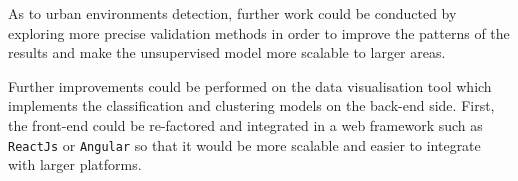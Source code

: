 \documentclass[bsc,frontabs,twoside,singlespacing, parskip,deptreport]{infthesis}     %
\begin{document}
As to urban environments detection, further work could be conducted by exploring more precise validation methods in order to improve the patterns of the results and make the unsupervised model more scalable to larger areas.

Further improvements could be performed on the data visualisation tool which implements the classification and clustering models on the back-end side. First, the front-end could be re-factored and integrated in a web framework such as \texttt{ReactJs} \cite{angular} or \texttt{Angular} \cite{angular} so that it would be more scalable and easier to integrate with larger platforms.






\end{document}
